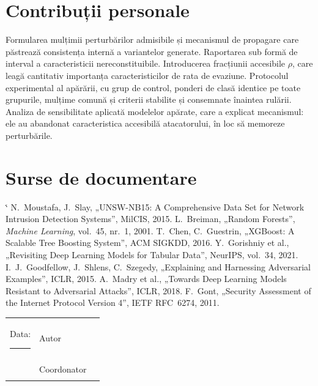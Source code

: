 \documentclass[11pt,a4paper]{article}
\makeatletter
\renewenvironment{thebibliography}[1]
  {\list{\@biblabel{\@arabic\c@enumiv}}%
     {\settowidth\labelwidth{\@biblabel{#1}}%
      \leftmargin\labelwidth \advance\leftmargin\labelsep
      \usecounter{enumiv}\let\p@enumiv\@empty
      \renewcommand\theenumiv{\@arabic\c@enumiv}}%
   \sloppy\clubpenalty4000\@clubpenalty\clubpenalty
   \widowpenalty4000\sfcode`\.\@m}
  {\def\@noitemerr{\@latex@warning{Bibliografie goala}}\endlist}
\makeatother
\begin{document}
\section{Contribuții personale}

Formularea mulțimii perturbărilor admisibile și mecanismul de propagare care păstrează
consistența internă a variantelor generate. Raportarea sub formă de interval a caracteristicii
nereconstituibile. Introducerea fracțiunii accesibile $\rho$, care leagă cantitativ importanța
caracteristicilor de rata de evaziune. Protocolul experimental al apărării, cu grup de
control, ponderi de clasă identice pe toate grupurile, mulțime comună și criterii stabilite și consemnate înaintea
rulării. Analiza de sensibilitate
aplicată modelelor apărate, care a explicat mecanismul: ele au abandonat caracteristica
accesibilă atacatorului, în loc să memoreze perturbările.

\section{Surse de documentare}

\vspace{-2mm}
\begin{thebibliography}{9}
	\setlength{\itemsep}{0pt}
	 N.~Moustafa, J.~Slay, „UNSW-NB15: A Comprehensive Data Set for
	Network Intrusion Detection Systems”, MilCIS, 2015.
	 L.~Breiman, „Random Forests”, \textit{Machine Learning},
	vol.~45, nr.~1, 2001.
	 T.~Chen, C.~Guestrin, „XGBoost: A Scalable Tree Boosting
	System”, ACM SIGKDD, 2016.
	 Y.~Gorishniy et al., „Revisiting Deep Learning Models
	for Tabular Data”, NeurIPS, vol.~34, 2021.
	 I.~J.~Goodfellow, J.~Shlens, C.~Szegedy, „Explaining
	and Harnessing Adversarial Examples”, ICLR, 2015.
	 A.~Madry et al., „Towards Deep Learning Models Resistant to
	Adversarial Attacks”, ICLR, 2018.
	 F.~Gont, „Security Assessment of the Internet Protocol Version
	4”, IETF RFC~6274, 2011.
\end{thebibliography}

\vspace{2mm}
\noindent
\begin{tabular}{@{}p{5cm}p{3cm}p{6cm}}
	Data: \rule{3cm}{0.4pt} & Autor & \rule{5.5cm}{0.4pt} \\[6mm]
	& Coordonator & \rule{5.5cm}{0.4pt} \\
\end{tabular}
\end{document}

